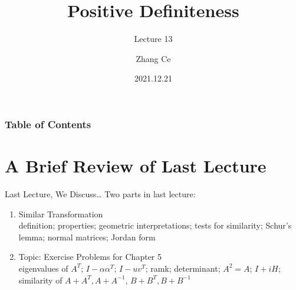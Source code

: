 \documentclass{beamer}
\title[Linear Algebra] %
{Positive Definiteness}
\subtitle{Lecture 13}
\author[11910803@mail.sustech.edu.cn] %
{
    Zhang Ce
}
\institute[] %
{
    Department of Electrical and Electronic Engineering\\
    Southern University of Science and Technology
}
\date[2021.12.21] %
{2021.12.21}
\begin{document}
\frame{\titlepage}


\begin{frame}
\frametitle{Table of Contents}
\tableofcontents
\end{frame}
\section{A Brief Review of Last Lecture}
\begin{frame}{Last Lecture, We Discuss\dots}
Two parts in last lecture:
    \begin{enumerate}
        \item Similar Transformation\\
        definition; properties; geometric interpretations; tests for similarity; Schur's lemma; normal matrices; Jordan form
        \item Topic: Exercise Problems for Chapter 5\\
        eigenvalues of $A^T$; $I-\alpha \alpha^T$; $I-u v^T$; ramk; determinant; $A^2=A$; $I+iH$; similarity of $A+A^T, A+A^{-1}$, $B+B^T, B+B^{-1}$
    \end{enumerate}

\end{frame}
\end{document}
